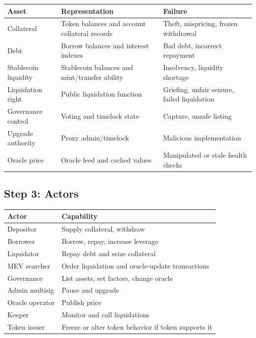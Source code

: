 {\def\LTcaptype{none} %
\begin{longtable}[]{@{}
  >{\raggedright\arraybackslash}p{}
  >{\raggedright\arraybackslash}p{}
  >{\raggedright\arraybackslash}p{}@{}}
\toprule\noalign{}
\begin{minipage}[b]{\linewidth}\raggedright
Asset
\end{minipage} & \begin{minipage}[b]{\linewidth}\raggedright
Representation
\end{minipage} & \begin{minipage}[b]{\linewidth}\raggedright
Failure
\end{minipage} \\
\midrule\noalign{}
\endhead
\bottomrule\noalign{}
\endlastfoot
Collateral & Token balances and account collateral records & Theft,
mispricing, frozen withdrawal \\
Debt & Borrow balances and interest indexes & Bad debt, incorrect
repayment \\
Stablecoin liquidity & Stablecoin balances and mint/transfer ability &
Insolvency, liquidity shortage \\
Liquidation right & Public liquidation function & Griefing, unfair
seizure, failed liquidation \\
Governance control & Voting and timelock state & Capture, unsafe
listing \\
Upgrade authority & Proxy admin/timelock & Malicious implementation \\
Oracle price & Oracle feed and cached values & Manipulated or stale
health checks \\
\end{longtable}
}

\subsection{Step 3: Actors}

{\def\LTcaptype{none} %
\begin{longtable}[]{@{}ll@{}}
\toprule\noalign{}
Actor & Capability \\
\midrule\noalign{}
\endhead
\bottomrule\noalign{}
\endlastfoot
Depositor & Supply collateral, withdraw \\
Borrower & Borrow, repay, increase leverage \\
Liquidator & Repay debt and seize collateral \\
MEV searcher & Order liquidation and oracle-update transactions \\
Governance & List assets, set factors, change oracle \\
Admin multisig & Pause and upgrade \\
Oracle operator & Publish price \\
Keeper & Monitor and call liquidations \\
Token issuer & Freeze or alter token behavior if token supports it \\
\end{longtable}
}

